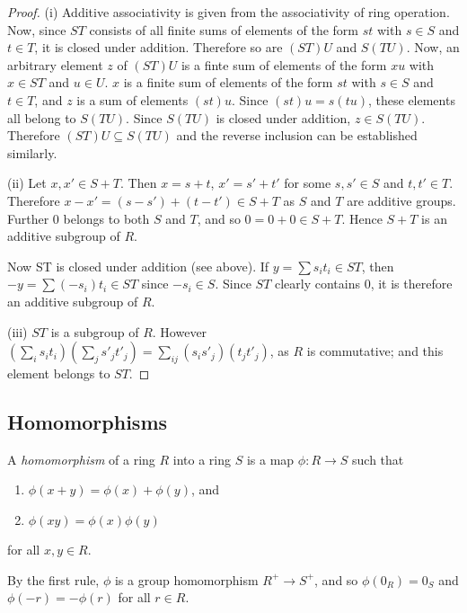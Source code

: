 \begin{proof}
  (i) Additive associativity is given from the associativity of ring operation.
  Now, since $ST$ consists of all finite sums of elements of the form $st$ with
  $s \in S$ and $t \in T$, it is closed under addition. Therefore so are $(ST)U$
  and $S(TU)$. Now, an arbitrary element $z$ of $(ST)U$ is a finte sum of elements
  of the form $xu$ with $x \in ST$ and $u \in U$. $x$ is a finite sum of elements
  of the form $st$ with $s \in S$ and $t \in T$, and $z$ is a sum of elements
  $(st)u$. Since $(st)u = s(tu)$, these elements all belong to $S(TU)$. Since
  $S(TU)$ is closed under addition, $z \in S(TU)$. Therefore $(ST)U \subseteq
  S(TU)$ and the reverse inclusion can be established similarly.

  (ii) Let $x, x' \in S + T$. Then $x = s + t$, $x' = s' + t'$ for some $s, s' \in S$
  and $t, t' \in T$. Therefore $x - x' = (s - s') + (t - t') \in S + T$ as $S$
  and $T$ are additive groups. Further $0$ belongs to both $S$ and $T$, and so 
  $0 = 0 + 0 \in S + T$. Hence $S + T$ is an additive subgroup of $R$.

  Now ST is closed under addition (see above). If $y = \sum s_i t_i \in ST$, then
  $-y = \sum (-s_i)t_i \in ST$ since $-s_i \in S$. Since $ST$ clearly contains $0$,
  it is therefore an additive subgroup of $R$.

  (iii) $ST$ is a subgroup of $R$. However $(\sum_i s_i t_i)(\sum_j s'_j t'_j) =
  \sum_{ij}(s_i s'_j)(t_j t'_j)$, as $R$ is commutative; and this element belongs
  to $ST$.
\end{proof}

\subsection{Homomorphisms}

\begin{Def}
  A \emph{homomorphism} of a ring $R$ into a ring $S$ is a map
  $\phi : R \to S$ such that
  \begin{enumerate}[label=(\roman*)]
    \item $\phi(x+y) = \phi(x) + \phi(y)$, and
    \item $\phi(xy) = \phi(x) \phi(y)$
  \end{enumerate}
  for all $x, y \in R$.
\end{Def}

By the first rule, $\phi$ is a group homomorphism $R^+ \to S^+$, and so
$\phi(0_R) = 0_S$ and $\phi(-r) = -\phi(r)$ for all $r \in R$.

